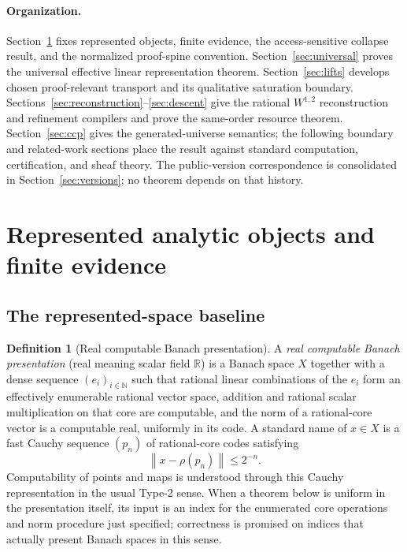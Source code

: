 \documentclass[11pt]{article}
\theoremstyle{definition}
\newtheorem{definition}[theorem]{Definition}
\newcommand{\norm}[1]{\left\lVert #1 \right\rVert}
\newcommand{\R}{\mathbb{R}}
\newcommand{\N}{\mathbb{N}}
\begin{document}
\paragraph{Organization.}
Section~\ref{sec:evidence} fixes represented objects, finite evidence, the access-sensitive
collapse result, and the normalized proof-spine convention.  Section~\ref{sec:universal}
proves the universal effective linear representation theorem.  Section~\ref{sec:lifts}
develops chosen proof-relevant transport and its qualitative saturation boundary.
Sections~\ref{sec:reconstruction}--\ref{sec:descent} give the rational $W^{1,2}$
reconstruction and refinement compilers and prove the same-order resource theorem.
Section~\ref{sec:ccp} gives the generated-universe semantics; the following boundary and
related-work sections place the result against standard computation, certification, and
sheaf theory.  The public-version correspondence is consolidated in
Section~\ref{sec:versions}; no theorem depends on that history.

\section{Represented analytic objects and finite evidence}\label{sec:evidence}

\subsection{The represented-space baseline}

\begin{definition}[Real computable Banach presentation]\label{def:cban}
A \emph{real computable Banach presentation} (real meaning scalar field $\R$) is a Banach
space $X$ together with a dense sequence $(e_i)_{i\in\N}$ such that rational linear
combinations of the $e_i$ form an effectively enumerable rational vector space, addition
and rational scalar multiplication on that core are computable, and the norm of a
rational-core vector is a computable real, uniformly in its code.  A standard name of
$x\in X$ is a fast Cauchy sequence $(p_n)$ of rational-core codes satisfying
\[
 \norm{x-\rho(p_n)}\le 2^{-n}.
\]
Computability of points and maps is understood through this Cauchy representation in the
usual Type-2 sense.  When a theorem below is uniform in the presentation itself, its input
is an index for the enumerated core operations and norm procedure just specified; correctness
is promised on indices that actually present Banach spaces in this sense.
\end{definition}
\end{document}
